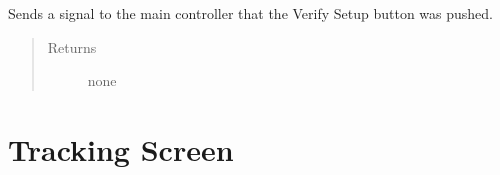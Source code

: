 \documentclass[letterpaper,10pt,english]{sphinxmanual}
\begin{document}
\begin{fulllineitems}
\begin{fulllineitems}
\begin{quote}
\begin{description}
\end{description}\end{quote}

\end{fulllineitems}


\begin{fulllineitems}
\label{\detokenize{index:src.Views.View_StartupScreen.StartupWindow.signalVerifySetup}}
Sends a signal to the main controller that the Verify Setup button was pushed.
\begin{quote}\begin{description}
\item[{Returns}] \leavevmode
none

\end{description}\end{quote}

\end{fulllineitems}


\end{fulllineitems}



\chapter{Tracking Screen}
\label{\detokenize{index:module-src.Views.View_TrackingScreen}}\label{\detokenize{index:tracking-screen}}
\end{document}
